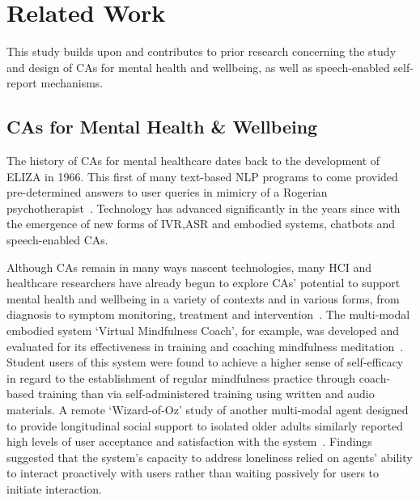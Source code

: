 \section{Related Work}\label{sec:related_work}

    This study builds upon and contributes to prior research concerning the study and design of \ac{CA}s for mental health and wellbeing, as well as speech-enabled self-report mechanisms.

    \subsection{\aclp{CA} for Mental Health \& Wellbeing}\label{sec:ca_mentah_health}
    
        The history of \ac{CA}s for mental healthcare dates back to the development of ELIZA in 1966. This first of many text-based \acl{NLP} programs to come provided pre-determined answers to user queries in mimicry of a Rogerian psychotherapist~\cite{eliza1966Weizenbaum}. Technology has advanced significantly in the years since with the emergence of new forms of \ac{IVR},\ac{ASR} and embodied systems, chatbots and speech-enabled \ac{CA}s. 
        
        Although \ac{CA}s remain in many ways nascent technologies, many \ac{HCI} and healthcare researchers have already begun to explore \ac{CA}s' potential to support mental health and wellbeing in a variety of contexts and in various forms, from diagnosis to symptom monitoring, treatment and intervention~\cite{gaffney2019conversational, laranjo2018conversational, vaidyam2019chatbots, lovejoy2019technology}. The multi-modal embodied system `Virtual Mindfulness Coach', for example, was  developed and evaluated for its effectiveness in training and coaching mindfulness meditation~\cite{hudlicka2013virtual}. Student users of this system were found to achieve a higher sense of self-efficacy in regard to the establishment of regular mindfulness practice through coach-based training than via self-administered training using written and audio materials. A remote `Wizard-of-Oz' study of another multi-modal agent designed to provide longitudinal social support to isolated older adults similarly reported high levels of user acceptance and satisfaction with the system~\cite{bickmore2005social}. Findings suggested that the system's capacity to address loneliness relied on agents' ability to interact proactively with users rather than waiting passively for users to initiate interaction.

